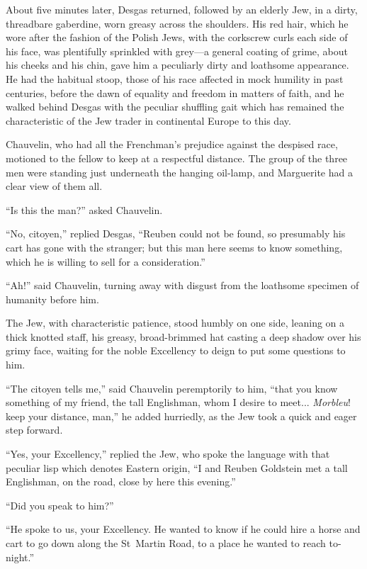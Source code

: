 About five minutes later, Desgas returned, followed by an elderly Jew, in a dirty, threadbare gaberdine, worn greasy across the shoulders. His red hair, which he wore after the fashion of the Polish Jews, with the corkscrew curls each side of his face, was plentifully sprinkled with grey---a general coating of grime, about his cheeks and his chin, gave him a peculiarly dirty and loathsome appearance. He had the habitual stoop, those of his race affected in mock humility in past centuries, before the dawn of equality and freedom in matters of faith, and he walked behind Desgas with the peculiar shuffling gait which has remained the characteristic of the Jew trader in continental Europe to this day.

Chauvelin, who had all the Frenchman's prejudice against the despised race, motioned to the fellow to keep at a respectful distance. The group of the three men were standing just underneath the hanging oil-lamp, and Marguerite had a clear view of them all.

\enquote{Is this the man?} asked Chauvelin.

\enquote{No, citoyen,} replied Desgas, \enquote{Reuben could not be found, so presumably his cart has gone with the stranger; but this man here seems to know something, which he is willing to sell for a consideration.}

\enquote{Ah!} said Chauvelin, turning away with disgust from the loathsome specimen of humanity before him.

The Jew, with characteristic patience, stood humbly on one side, leaning on a thick knotted staff, his greasy, broad-brimmed hat casting a deep shadow over his grimy face, waiting for the noble Excellency to deign to put some questions to him.

\enquote{The citoyen tells me,} said Chauvelin peremptorily to him, \enquote{that you know something of my friend, the tall Englishman, whom I desire to meet... \textit{Morbleu}! keep your distance, man,} he added hurriedly, as the Jew took a quick and eager step forward.

\enquote{Yes, your Excellency,} replied the Jew, who spoke the language with that peculiar lisp which denotes Eastern origin, \enquote{I and Reuben Goldstein met a tall Englishman, on the road, close by here this evening.}

\enquote{Did you speak to him?}

\enquote{He spoke to us, your Excellency. He wanted to know if he could hire a horse and cart to go down along the St~Martin Road, to a place he wanted to reach to-night.}

